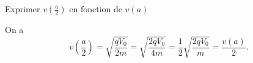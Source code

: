 




\begin{enonce}
	Exprimer $v\left(\frac{a}{2}\right)$ en fonction de $v(a)$
\end{enonce}
	
	
\begin{corrige}
On a 
	\[
		v\left(\frac{a}{2}\right) = \sqrt{\frac{qV_0}{2m}} = \sqrt{\frac{2qV_0}{4m}}  = \frac{1}{2}\sqrt{\frac{2qV_0}{m}} = \frac{v(a)}{2}.
	\]
\end{corrige}


\finEntrainement













\hauteurLargeurCadreReponse		{7mm}{6cm}
\typeEntrainement				{} %
\initialisationEntrainement

